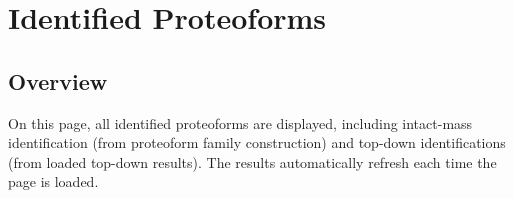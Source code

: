 
\section{Identified Proteoforms}


\subsection{Overview}

On this page, all identified proteoforms are displayed, including intact-mass identification (from proteoform family construction) and top-down identifications (from loaded top-down results). The results automatically refresh each time the page is loaded. 

